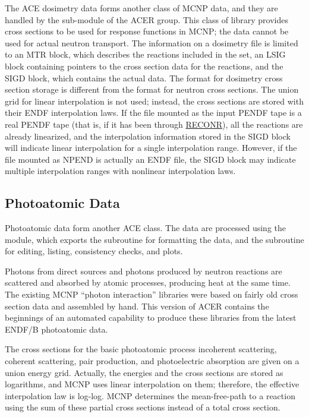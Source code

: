 The ACE dosimetry data forms another class
of MCNP data, and they are handled by the
 sub-module of the
ACER group. This class of library provides cross sections to be
used for response functions in MCNP; the data cannot be used
for actual neutron transport.  The information on a dosimetry file
is limited to an MTR block, which describes the reactions
included in the set, an LSIG block containing pointers to the
cross section data for the reactions, and the SIGD block,
which contains the actual data.  The format for dosimetry cross section
storage is different from the format for neutron cross sections.
The union grid for linear interpolation is not used; instead, the
cross sections are stored with their ENDF interpolation laws.  If
the file mounted as the input PENDF tape is a real PENDF tape (that is,
if it has been through \hyperlink{sRECONRhy}{RECONR}),
all the reactions are already linearized,
and the interpolation information stored in the SIGD block will
indicate linear interpolation for a single interpolation
range.  However, if the file mounted as NPEND is actually an ENDF
file, the SIGD block may indicate multiple interpolation ranges with
nonlinear interpolation laws.

\subsection{Photoatomic Data}
\label{ssACER_pa}

Photoatomic data form another ACE class.
The data are processed using the 
module, which exports
the subroutine  for
formatting the data, and the subroutine
 for editing, listing,
consistency checks, and plots.

Photons from direct sources and photons produced by neutron reactions
are scattered and absorbed by atomic processes, producing heat at the
same time.  The existing MCNP ``photon interaction'' libraries were
based on fairly old cross section data and assembled by
hand\cite{MCG,MCP}.  This version of ACER contains the beginnings
of an automated capability to produce these libraries from the latest
ENDF/B photoatomic data.

The cross sections for the basic photoatomic process incoherent
scattering, coherent scattering, pair production, and photoelectric
absorption are given on a union energy grid.  Actually, the energies
and the cross sections are stored as logarithms, and MCNP uses
linear interpolation on them; therefore, the effective interpolation
law is log-log.  MCNP determines the mean-free-path to a reaction
using the sum of these partial cross sections instead of a total
cross section.

